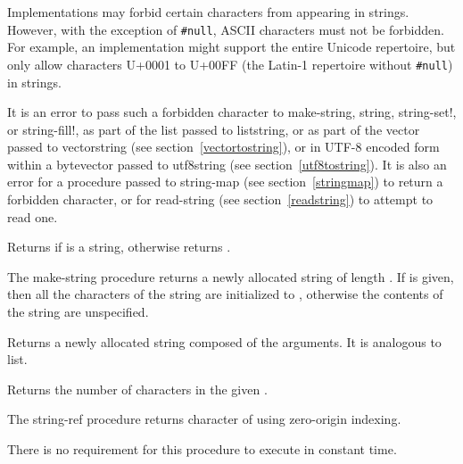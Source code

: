 Implementations may forbid certain characters from appearing in strings.
However, with the exception of {\tt \#\backwhack{}null}, ASCII characters must
not be forbidden.
For example, an implementation might support the entire Unicode repertoire,
but only allow characters U+0001 to U+00FF (the Latin-1 repertoire
without {\tt \#\backwhack{}null}) in strings.

It is an error to pass such a forbidden character to
{\cf make-string}, {\cf string}, {\cf string-set!}, or {\cf string-fill!},
as part of the list passed to {\cf list\coerce{}string},
or as part of the vector passed to {\cf vector\coerce{}string}
(see section~\ref{vectortostring}),
or in UTF-8 encoded form within a bytevector passed to
{\cf utf8\coerce{}string} (see section~\ref{utf8tostring}).
It is also an error for a procedure passed to {\cf string-map}
(see section~\ref{stringmap}) to return a forbidden character,
or for {\cf read-string} (see section~\ref{readstring})
to attempt to read one.

\begin{entry}{
}

Returns \schtrue{} if  is a string, otherwise returns \schfalse.
\end{entry}


\begin{entry}{
}

The {\cf make-string} procedure returns a newly allocated string of
length .  If  is given, then all the characters of the string
are initialized to , otherwise the contents of the
string are unspecified.

\end{entry}

\begin{entry}{
}

Returns a newly allocated string composed of the arguments.
It is analogous to {\cf list}.

\end{entry}

\begin{entry}{
}

Returns the number of characters in the given .
\end{entry}


\begin{entry}{
}

The {\cf string-ref} procedure returns character  of  using zero-origin indexing.
\end{entry}
There is no requirement for this procedure to execute in constant time.


